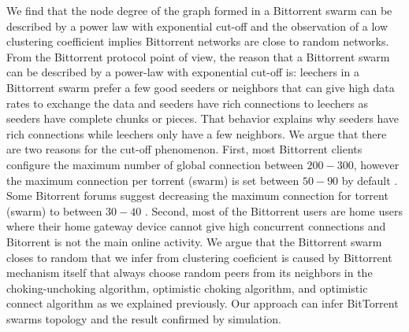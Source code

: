 We find that the node degree of the graph formed in a Bittorrent swarm can be described by a power law with exponential cut-off and the observation of a low clustering coefficient implies Bittorrent networks are close to random networks.
From the Bittorrent protocol point of view, the reason that a Bittorrent swarm can be described by a power-law with exponential cut-off is: leechers in a Bittorrent swarm prefer a few good seeders or neighbors that can give high data rates to exchange the data and seeders have rich connections to leechers as seeders have complete chunks or pieces. 
That behavior explains why seeders have rich connections while leechers only have a few neighbors. 
We argue that there are two reasons for the cut-off phenomenon. 
First, most Bittorrent clients configure the maximum number of global connection between $200-300$, however the maximum connection per torrent (swarm) is set between $50 - 90$ by default \cite{clientv}\cite{clientu}.
Some Bitorrent forums suggest decreasing the maximum connection for torrent (swarm) to between $30-40$ \cite{clientf}. 
Second, most of the Bittorrent users are home users where their home gateway device cannot give high concurrent connections and Bitorrent is not the main online activity. 
We argue that the Bittorrent swarm closes to random that we infer from clustering coeficient is caused by Bittorrent mechanism itself that always choose random peers from its neighbors in the choking-unchoking algorithm, optimistic choking algorithm, and optimistic connect algorithm as we explained previously.
Our approach can infer BitTorrent swarms topology and the result confirmed by simulation.

